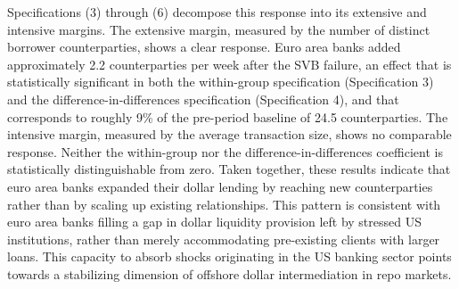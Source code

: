 \documentclass[english, 12pt, oneside]{article}
\begin{document}
Specifications (3) through (6) decompose this response into its extensive and intensive margins. The extensive margin, measured by the number of distinct borrower counterparties, shows a clear response. Euro area banks added approximately 2.2 counterparties per week after the SVB failure, an effect that is statistically significant in both the within-group specification (Specification 3) and the difference-in-differences specification (Specification 4), and that corresponds to roughly 9\% of the pre-period baseline of 24.5 counterparties. The intensive margin, measured by the average transaction size, shows no comparable response. Neither the within-group nor the difference-in-differences coefficient is statistically distinguishable from zero. Taken together, these results indicate that euro area banks expanded their dollar lending by reaching new counterparties rather than by scaling up existing relationships. This pattern is consistent with euro area banks filling a gap in dollar liquidity provision left by stressed US institutions, rather than merely accommodating pre-existing clients with larger loans. This capacity to absorb shocks originating in the US banking sector points towards a stabilizing dimension of offshore dollar intermediation in repo markets.
\end{document}
